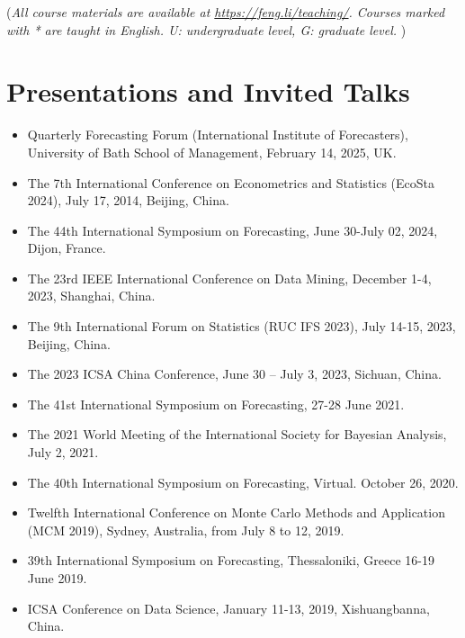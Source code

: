 \documentclass[twoside,a4paper]{article}
\begin{document}
{\footnotesize (\emph{All course materials are available at
    \emph{\url{https://feng.li/teaching/}}. Courses marked with * are taught in English. U: undergraduate level, G: graduate level. })}


\section{Presentations and Invited Talks}
\begin{itemize}

\item Quarterly Forecasting Forum (International Institute of Forecasters), University of Bath School of Management, February 14, 2025, UK.

\item The 7th International Conference on Econometrics and Statistics (EcoSta 2024), July 17, 2014, Beijing, China.

\item The 44th International Symposium on Forecasting, June 30-July 02, 2024, Dijon, France.

\item The 23rd IEEE International Conference on Data Mining, December 1-4, 2023, Shanghai, China.

\item The 9th International Forum on Statistics (RUC IFS 2023), July 14-15, 2023, Beijing, China.

\item The 2023 ICSA China Conference, June 30 – July 3, 2023, Sichuan, China.

\item The 41st International Symposium on Forecasting, 27-28 June 2021.

\item The 2021 World Meeting of the International Society for Bayesian Analysis, July 2, 2021.

\item The 40th International Symposium on Forecasting, Virtual. October 26, 2020.

\item Twelfth International Conference on Monte Carlo Methods and Application (MCM 2019), Sydney, Australia, from July 8 to 12, 2019.

\item 39th International Symposium on Forecasting, Thessaloniki, Greece 16-19 June 2019.

\item ICSA Conference on Data Science, January 11-13, 2019, Xishuangbanna, China.


\end{itemize}
\end{document}
